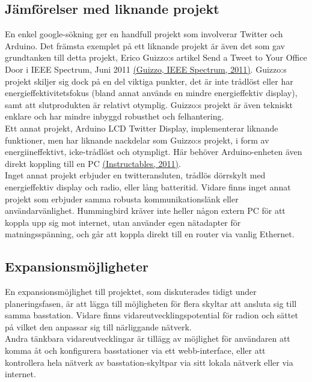 \documentclass[a4paper,11pt]{article}
\begin{document}
\subsection{Jämförelser med liknande projekt}
En enkel google-sökning ger en handfull projekt som involverar Twitter och Arduino. Det främsta exemplet på ett liknande projekt är även det som gav grundtanken till detta projekt, Erico Guizzo:s artikel Send a Tweet to Your Office Door i IEEE Spectrum, Juni 2011 \hyperref[spectrum]{(Guizzo, IEEE Spectrum, 2011)}. Guizzo:s projekt skiljer sig dock på en del viktiga punkter, det är inte trådlöst eller har energieffektivitetsfokus (bland annat används en mindre energieffektiv display), samt att slutprodukten är relativt otymplig. Guizzo:s projekt är även tekniskt enklare och har mindre inbyggd robusthet och felhantering. \\

Ett annat projekt, Arduino LCD Twitter Display, implementerar liknande funktioner, men har liknande nackdelar som Guizzo:s projekt, i form av energiineffektivt, icke-trådlöst och otympligt. Här behöver Arduino-enheten även direkt koppling till en PC \hyperref[instructables]{(Instructables, 2011)}. \\

Inget annat projekt erbjuder en twitteransluten, trådlös dörrskylt med energieffektiv display och radio, eller lång batteritid. Vidare finns inget annat projekt som erbjuder samma robusta kommunikationslänk eller användarvänlighet. Hummingbird kräver inte heller någon extern PC för att koppla upp sig mot internet, utan använder egen nätadapter för matningsspänning, och går att koppla direkt till en router via vanlig Ethernet. \\

\subsection{Expansionsmöjligheter}
En expansionsmöjlighet till projektet, som diskuterades tidigt under planeringsfasen, är att lägga till möjligheten för flera skyltar att ansluta sig till samma basstation. Vidare finns vidareutvecklingspotential för radion och sättet på vilket den anpassar sig till närliggande nätverk. \\

Andra tänkbara vidareutvecklingar är tillägg av möjlighet för användaren att komma åt och konfigurera basstationer via ett webb-interface, eller att kontrollera hela nätverk av basstation-skyltpar via sitt lokala nätverk eller via internet. \\
\end{document}
